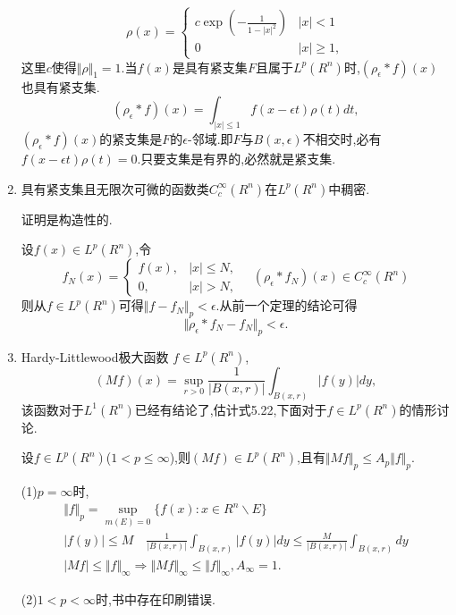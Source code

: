 \documentclass[12pt,a4paper,openany]{book}
\begin{document}
\begin{enumerate}
\[
\rho(x)=\begin{cases}
c\exp(-\frac{1}{1-|x|^2}) &|x|<1\\
0&|x| \ge 1,
\end{cases}
\]
这里$c$使得$\Vert{\rho}\Vert_1=1$.当$f(x)$是具有紧支集$F$且属于$L^p(R^n)$时,$(\rho_{\epsilon}*f)(x)$也具有紧支集.
\[
(\rho_{\epsilon}*f)(x)=\int_{|x|\le 1}{f(x-\epsilon{}t)\rho(t)dt},
\]
$(\rho_{\epsilon}*f)(x)$的紧支集是$F$的$\epsilon$-邻域.即$F$与$B(x,\epsilon)$不相交时,必有$f(x-\epsilon{}t)\rho(t)=0$.只要支集是有界的,必然就是紧支集.

\item 具有紧支集且无限次可微的函数类$C_c^{\infty}(R^n)$在$L^p(R^n)$中稠密.

证明是构造性的.

设$f(x) \in L^p(R^n)$,令
\[
\left.
f_N(x)=\begin{cases}
f(x), &|x| \le N, \\
0,&|x|>N,
\end{cases}
\right.
\quad (\rho_{\epsilon}*f_N)(x) \in C_c^{\infty}(R^n)
\]
则从$f \in L^p(R^n)$可得$\Vert{f-f_N}\Vert_p<\epsilon$.从前一个定理的结论可得
\[
\Vert{\rho_{\epsilon}*f_N-f_N}\Vert_p<\epsilon.
\]

\item Hardy-Littlewood极大函数
$f \in L^p(R^n)$,
\[
(Mf)(x)=\sup_{r>0}{\frac{1}{|B(x,r)|}\int_{B(x,r)}{|f(y)|dy}},
\]
该函数对于$L^1(R^n)$已经有结论了,估计式5.22,下面对于$f \in L^p(R^n)$的情形讨论.

设$f \in L^p(R^n)$($1 < p \le \infty$),则$(Mf) \in L^p(R^n)$,且有$\Vert{Mf}\Vert_p \le A_p\Vert{f}\Vert_p$.

(1)$p=\infty$时,
\begin{gather*}
\Vert{f}\Vert_p=\sup_{m(E)=0}{\{f(x):x\in R^n \backslash E\}} \\
|f(y)|\le M \quad \frac{1}{|B(x,r)|}\int_{B(x,r)}{|f(y)|dy} \le \frac{M}{|B(x,r)|}\int_{B(x,r)}{dy}\\
|Mf| \le \Vert{f}\Vert_{\infty} \Rightarrow \Vert{Mf}\Vert_{\infty} \le \Vert{f}\Vert_{\infty},A_{\infty}=1.
\end{gather*}

(2)$1<p<\infty$时,书中存在印刷错误.


\end{enumerate}
\end{document}
